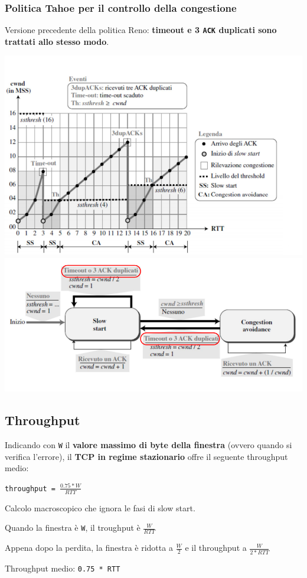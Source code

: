 \documentclass[10pt]{article}
\begin{document}
\subsubsection{Politica Tahoe per il controllo della congestione}
Versione precedente della politica Reno: \textbf{timeout e 3 \texttt{ACK} duplicati sono trattati allo stesso modo}.
\begin{center}
\includegraphics[scale=0.75]{tcptahoeesempio.png}\\
\includegraphics[scale=0.65]{tcptahoe.png}
\end{center}
\subsection{Throughput}
Indicando con \texttt{W} il \textbf{valore massimo di byte della finestra} (ovvero quando si verifica l'errore), il \textbf{TCP in regime stazionario} offre il seguente throughput medio:
\begin{center}
\texttt{throughput = $\frac{0.75 * W}{RTT}$}
\end{center}
Calcolo macroscopico che ignora le fasi di slow start.
\begin{list}{}{Con \texttt{W} la dimensione della finestra alla perdita:}
\item Quando la finestra è \texttt{W}, il troughput è $\frac{W}{RTT}$
\item Appena dopo la perdita, la finestra è ridotta a $\frac{W}{2}$ e il throughput a $\frac{W}{2 * RTT}$
\item Throughput medio: \texttt{0.75 * RTT}
\end{list}
\end{document}
